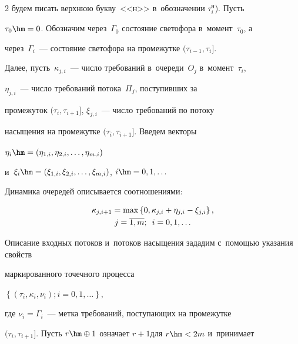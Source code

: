 \begin{multicols}{2}
будем писать верхнюю букву~<<н>> в~обозначении $\tau^{\mathrm{н}}_i$). Пусть

$\tau_0\hm=0$. Обозначим через~$\Gamma_0$ состояние светофора в~момент~$\tau_0$, а

через~$\Gamma_i$~--- состояние светофора на промежутке $(\tau_{i-1}, \tau_i]$.

Далее, пусть~$\kappa_{j,i}$~--- число требований в~очереди~$O_j$ в~момент~$\tau_i$, 

$\eta_{j,i}$~--- число требований потока~$\Pi_j$, поступивших за

промежуток $(\tau_i, \tau_{i+1}]$, $\xi_{j,i}$~--- число требований по потоку

насыщения на промежутке $(\tau_i, \tau_{i+1}]$. Введем векторы

$\eta_i\hm=(\eta_{1,i}, \eta_{2,i}, \ldots, \eta_{m,i})$

и~$\xi_i\hm=(\xi_{1,i}, \xi_{2,i}, \ldots, \xi_{m,i})$, $i\hm=0, 1, \ldots$



Динамика очередей описывается соотноше\-ни\-ями:



\vspace*{-6pt}



\noindent

\begin{multline*}

\kappa_{j,i+1}= \max\left\{0, \kappa_{j,i}+\eta_{j,i}-\xi_{j,i}\right\}, \\ 

j=\overline{1,m};\enskip i=0,1,\ldots

\end{multline*}



\vspace*{-3pt}



\noindent

Описание входных потоков и~потоков насыщения зададим с~помощью указания свойств

маркированного точечного процесса

$\left\{(\tau_i, \kappa_i, \nu_i); i=0, 1, \ldots\right\},

$

где $\nu_i=\Gamma_i$~--- метка требований, поступающих на промежутке

$(\tau_i, \tau_{i+1}]$. Пусть $r \hm\oplus 1$ означает $r+1$\linebreak для $r\hm<2m$ и~принимает


\end{multicols}
